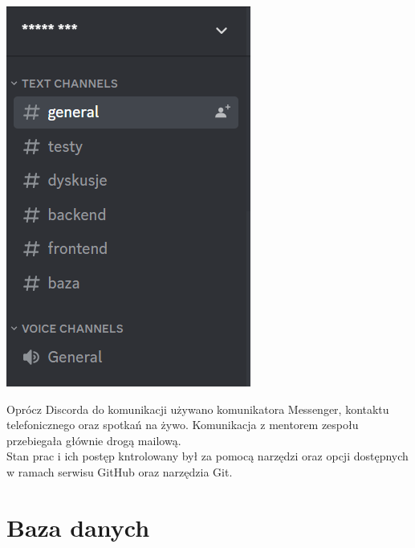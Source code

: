 \documentclass[]{article}
\begin{document}
    \begin{center}
        \includegraphics[scale=0.8]{discord.PNG}
    \end{center}

    Oprócz Discorda do komunikacji używano komunikatora Messenger, kontaktu telefonicznego oraz spotkań na żywo. Komunikacja z mentorem zespołu przebiegała głównie drogą mailową. \\
    Stan prac i ich postęp kntrolowany był za pomocą narzędzi oraz opcji dostępnych w ramach serwisu GitHub oraz narzędzia Git.

    \section{Baza danych}
\end{document}
